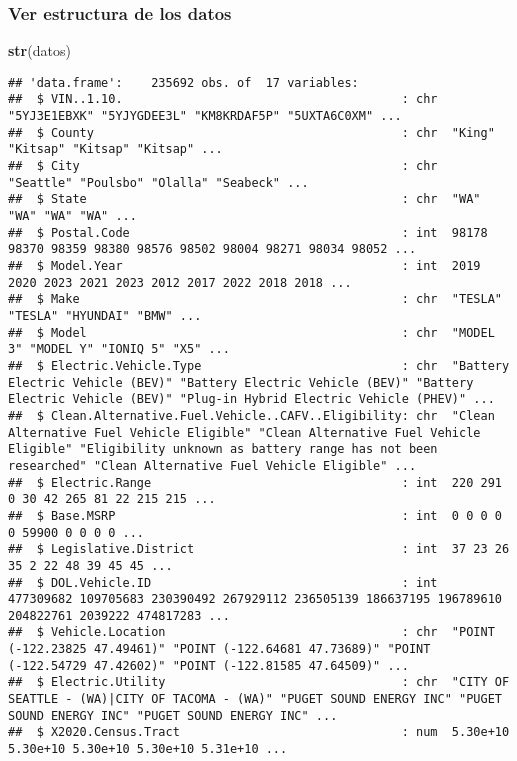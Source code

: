 \documentclass[
]{article}
\newenvironment{Shaded}{\begin{snugshade}}{\end{snugshade}}
\newcommand{\FunctionTok}[1]{\textcolor[rgb]{0.13,0.29,0.53}{\textbf{#1}}}
\newcommand{\NormalTok}[1]{#1}
\begin{document}
\subsubsection{Ver estructura de los
datos}\label{ver-estructura-de-los-datos}

\begin{Shaded}
\begin{Highlighting}[]
\FunctionTok{str}\NormalTok{(datos)}
\end{Highlighting}
\end{Shaded}

\begin{verbatim}
## 'data.frame':    235692 obs. of  17 variables:
##  $ VIN..1.10.                                       : chr  "5YJ3E1EBXK" "5YJYGDEE3L" "KM8KRDAF5P" "5UXTA6C0XM" ...
##  $ County                                           : chr  "King" "Kitsap" "Kitsap" "Kitsap" ...
##  $ City                                             : chr  "Seattle" "Poulsbo" "Olalla" "Seabeck" ...
##  $ State                                            : chr  "WA" "WA" "WA" "WA" ...
##  $ Postal.Code                                      : int  98178 98370 98359 98380 98576 98502 98004 98271 98034 98052 ...
##  $ Model.Year                                       : int  2019 2020 2023 2021 2023 2012 2017 2022 2018 2018 ...
##  $ Make                                             : chr  "TESLA" "TESLA" "HYUNDAI" "BMW" ...
##  $ Model                                            : chr  "MODEL 3" "MODEL Y" "IONIQ 5" "X5" ...
##  $ Electric.Vehicle.Type                            : chr  "Battery Electric Vehicle (BEV)" "Battery Electric Vehicle (BEV)" "Battery Electric Vehicle (BEV)" "Plug-in Hybrid Electric Vehicle (PHEV)" ...
##  $ Clean.Alternative.Fuel.Vehicle..CAFV..Eligibility: chr  "Clean Alternative Fuel Vehicle Eligible" "Clean Alternative Fuel Vehicle Eligible" "Eligibility unknown as battery range has not been researched" "Clean Alternative Fuel Vehicle Eligible" ...
##  $ Electric.Range                                   : int  220 291 0 30 42 265 81 22 215 215 ...
##  $ Base.MSRP                                        : int  0 0 0 0 0 59900 0 0 0 0 ...
##  $ Legislative.District                             : int  37 23 26 35 2 22 48 39 45 45 ...
##  $ DOL.Vehicle.ID                                   : int  477309682 109705683 230390492 267929112 236505139 186637195 196789610 204822761 2039222 474817283 ...
##  $ Vehicle.Location                                 : chr  "POINT (-122.23825 47.49461)" "POINT (-122.64681 47.73689)" "POINT (-122.54729 47.42602)" "POINT (-122.81585 47.64509)" ...
##  $ Electric.Utility                                 : chr  "CITY OF SEATTLE - (WA)|CITY OF TACOMA - (WA)" "PUGET SOUND ENERGY INC" "PUGET SOUND ENERGY INC" "PUGET SOUND ENERGY INC" ...
##  $ X2020.Census.Tract                               : num  5.30e+10 5.30e+10 5.30e+10 5.30e+10 5.31e+10 ...
\end{verbatim}
\end{document}
